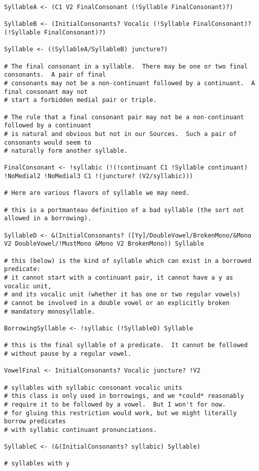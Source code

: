 \documentclass[12pt]{book}
\begin{document}
{\begin{verbatim}
SyllableA <- (C1 V2 FinalConsonant (!Syllable FinalConsonant)?)

SyllableB <- (InitialConsonants? Vocalic (!Syllable FinalConsonant)? (!Syllable FinalConsonant)?)

Syllable <- ((SyllableA/SyllableB) juncture?)

# The final consonant in a syllable.  There may be one or two final consonants.  A pair of final
# consonants may not be a non-continuant followed by a continuant.  A final consonant may not
# start a forbidden medial pair or triple.

# The rule that a final consonant pair may not be a non-continuant followed by a continuant
# is natural and obvious but not in our Sources.  Such a pair of consonants would seem to 
# naturally form another syllable.

FinalConsonant <- !syllabic (!(!continuant C1 !Syllable continuant) !NoMedial2 !NoMedial3 C1 !(juncture? (V2/syllabic)))

# Here are various flavors of syllable we may need.

# this is a portmanteau definition of a bad syllable (the sort not allowed in a borrowing).

SyllableD <- &(InitialConsonants? ([Yy]/DoubleVowel/BrokenMono/&Mono V2 DoubleVowel/!MustMono &Mono V2 BrokenMono)) Syllable

# this (below) is the kind of syllable which can exist in a borrowed predicate:
# it cannot start with a continuant pair, it cannot have a y as vocalic unit,
# and its vocalic unit (whether it has one or two regular vowels) 
# cannot be involved in a double vowel or an explicitly broken 
# mandatory monosyllable.

BorrowingSyllable <- !syllabic (!SyllableD) Syllable

# this is the final syllable of a predicate.  It cannot be followed
# without pause by a regular vowel.

VowelFinal <- InitialConsonants? Vocalic juncture? !V2

# syllables with syllabic consonant vocalic units
# this class is only used in borrowings, and we *could* reasonably
# require it to be followed by a vowel.  But I won't for now.
# for gluing this restriction would work, but we might literally borrow predicates
# with syllabic continuant pronunciations.

SyllableC <- (&(InitialConsonants? syllabic) Syllable)

# syllables with y


\end{verbatim}}
\end{document}
